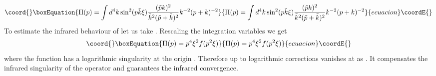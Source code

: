 \documentclass[a4paper,12pt]{article}
\begin{document}
\begin{equation}\coord{}\boxEquation{
\Pi(p)= \int d^4k \sin^2(p \tilde{k} \xi) 
\frac{(\tilde{p}k)^2}{\tilde{k}^2(\tilde{p}+\tilde{k})^2}
k^{-2}(p+k)^{-2}
\label{23e}
}{
\Pi(p)= \int d^4k \sin^2(p \tilde{k} \xi) 
\frac{(\tilde{p}k)^2}{\tilde{k}^2(\tilde{p}+\tilde{k})^2}
k^{-2}(p+k)^{-2}
}{ecuacion}\coordE{}\end{equation}
To estimate the infrared behaviour of \coordHE{} let us take 
 \coordHE{}. Rescaling the integration variables 
\coordHE{} we get
\begin{equation}\coord{}\boxEquation{
\Pi(p)=p^4 \xi^2f(p^2 \xi)
\label{23f}
}{
\Pi(p)=p^4 \xi^2f(p^2 \xi)
}{ecuacion}\coordE{}\end{equation}
where the function \coordHE{} has a logarithmic singularity at the 
origin \coordHE{}. Therefore up to 
 logarithmic corrections \coordHE{} vanishes at \coordHE{} as \coordHE{}. It 
 compensates the infrared singularity of the operator \myHighlight{$\Pi_{\mu \nu}$}\coordHE{} and 
guarantees the infrared convergence. 
\end{document}
